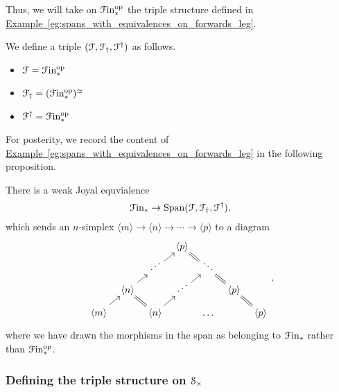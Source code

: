 \documentclass[main.tex]{subfiles}
\begin{document}
Thus, we will take on $\Finp\op$ the triple structure defined in \hyperref[eg:spans_with_equivalences_on_forwards_leg]{Example~\ref*{eg:spans_with_equivalences_on_forwards_leg}}.

\begin{definition}
  We define a triple $\triple{F}$ as follows.
  \begin{itemize}
    \item $\mathcal{F} = \Finp\op$

    \item $\mathcal{F}\downdag = (\Finp\op)^{\simeq}$

    \item $\mathcal{F}\updag = \Finp\op$
  \end{itemize}
\end{definition}

For posterity, we record the content of \hyperref[eg:spans_with_equivalences_on_forwards_leg]{Example~\ref*{eg:spans_with_equivalences_on_forwards_leg}} in the following proposition.

\begin{lemma}
  There is a weak Joyal equvialence
  \begin{equation*}
    \Finp \to \Span\triple{F},
  \end{equation*}
  which sends an $n$-simplex $\langle m \rangle \to \langle n \rangle \to \cdots \to \langle p \rangle$ to a diagram
  \begin{equation*}
    \begin{tikzcd}[row sep=small, column sep=tiny]
      &&& \respace{\langle p \rangle}
      \\
      && \respace{\iddots}
      \arrow[ur]
      && \respace{\ddots}
      \arrow[ul, equals]
      \\
      & \respace{\langle n \rangle}
      \arrow[ur]
      && \respace{\iddots}
      \arrow[ur]
      && \respace{\langle p \rangle}
      \arrow[ul, equals]
      \\
      \langle m \rangle
      \arrow[ur]
      && \respace{\langle n \rangle}
      \arrow[ul, equals]
      \arrow[ur]
      && \respace{\dots}
      && \respace{\langle p \rangle}
      \arrow[ul, equals]
    \end{tikzcd},
  \end{equation*}
  where we have drawn the morphisms in the span as belonging to $\Finp$ rather than $\Finp\op$.
\end{lemma}

\subsubsection{Defining the triple structure on \texorpdfstring{$\S_{\times}$}{S}}
\end{document}

